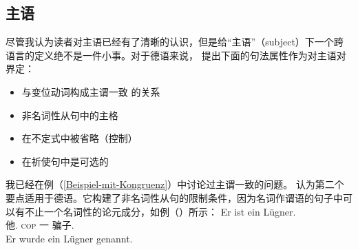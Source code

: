 \subsection{主语}
\label{Abschnitt-Subjekt}
尽管我认为读者对主语已经有了清晰的认识，但是给“主语”（subject）下一个跨语言的定义绝不是一件小事。对于德语来说， \citet{Reis82}提出下面的句法属性作为对主语对界定：
\begin{itemize}
\item 与变位动词构成主谓一致 的关系
\item 非名词性从句中的主格
\item 在不定式中被省略（控制）
\item 在祈使句中是可选的
\end{itemize}
我已经在例（\ref{Beispiel-mit-Kongruenz}）中讨论过主谓一致的问题。 \citet{Reis82}认为第二个要点适用于德语。它构建了非名词性从句的限制条件，因为名词作谓语的句子中可以有不止一个名词性的论元成分，如例（）所示：
\eal
\ex
\gll Er ist ein Lügner.\\
     他.\nom{} \textsc{cop} 一 骗子.\nom{}\\
\ex 
\gll Er wurde ein Lügner genannt.\\
